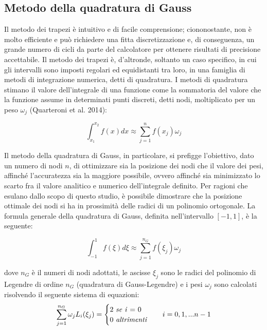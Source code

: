 \documentclass[12pt]{article} %
\begin{document}
\subsection{Metodo della quadratura di Gauss}

\noindent Il metodo dei trapezi è intuitivo e di facile comprensione; ciononostante, non è molto efficiente e può richiedere una fitta discretizzazione e, di conseguenza, un grande numero di cicli da parte del calcolatore per ottenere risultati di precisione accettabile. 
Il metodo dei trapezi è, d’altronde, soltanto un caso specifico, in cui gli intervalli sono imposti regolari ed equidistanti tra loro, in una famiglia di metodi di integrazione numerica, detti di quadratura. I metodi di quadratura stimano il valore dell’integrale di una funzione come la sommatoria del valore che la funzione assume in determinati punti discreti, detti nodi, moltiplicato per un peso $\omega_{j}$ (Quarteroni et al. 2014):

\begin{equation}
    \int_{x_1}^{x_2} f(x)dx\approx\sum_{j=1}^n f(x_j)\omega_j
    \label{eqn:formule_quadratura}
\end{equation}

\noindent Il metodo della quadratura di Gauss, in particolare, si prefigge l’obiettivo, dato un numero di nodi $n$, di ottimizzare sia la posizione dei nodi che il valore dei pesi, affinché l’accuratezza sia la maggiore possibile, ovvero affinché sia minimizzato lo scarto fra il valore analitico e numerico dell’integrale definito. Per ragioni che esulano dallo scopo di questo studio, è possibile dimostrare che la posizione ottimale dei nodi si ha in prossimità delle radici di un polinomio ortogonale. 
La formula generale della quadratura di Gauss, definita nell’intervallo $[-1,1]$, è la seguente:

\begin{equation}
    \int_{-1}^{1} f(\xi)d\xi\approx\sum_{j=1}^{n_G} f(\xi_{j})\omega_{j}
    \label{eqn:Gauss-Legendre_1}
\end{equation}

\noindent dove $n_G$ è il numeri di nodi adottati, le ascisse $\xi_{j}$ sono le radici del polinomio di Legendre di ordine $n_G$ (quadratura di Gauss-Legendre) e i pesi $\omega_j$ sono calcolati risolvendo il seguente sistema di equazioni:
\begin{align}
    \sum_{j=1}^{n_G} \omega_j L_i(\xi_j) = \begin{cases}\textrm{2 \textit{se i} = 0}\\\textrm{0 \textit{altrimenti}}\end{cases} && i = 0, 1, ... n-1
    \label{eqn:pesi_Gauss-Legendre_1}
\end{align}
\end{document}
